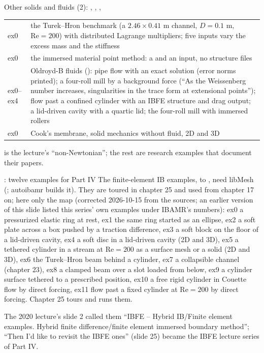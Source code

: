 \documentclass[aspectratio=169,11pt]{beamer}
\begin{document}
\begin{frame}{Other solids and fluids (2): , , , }
\label{fr:others2}
\scriptsize
\setlength{\tabcolsep}{3pt}
\begin{tabular}{@{}L{0.18\textwidth}L{0.78\textwidth}@{}}
\toprule
{} ex0 & the Turek--Hron benchmark (a $2.46\times0.41$ m channel, $D = 0.1$ m, $\mathrm{Re} = 200$) with distributed Lagrange multipliers; five inputs vary the excess mass and the stiffness\\
 ex0 & the immersed material point method: a  and an input, no structure files\\
 ex0--ex4 & Oldroyd-B fluids (): pipe flow with an exact solution (error norms printed); a four-roll mill by a background force (``As the Weissenberg number increases, singularities in the trace form at extensional points''); flow past a confined cylinder with an IBFE structure and drag output; a lid-driven cavity with a quartic lid; the four-roll mill with immersed rollers\\
 ex0 & Cook's membrane, solid mechanics without fluid, 2D and 3D\\
\bottomrule
\end{tabular}
\vspace{1mm}

\scriptsize {} is the lecture's ``non-Newtonian''; the rest are research examples that document their papers.
\end{frame}

\begin{frame}{: twelve examples for Part IV}
\label{fr:ibfe}
\footnotesize The finite-element IB examples,  to , need libMesh (; autoibamr builds it). They are toured in chapter 25 and used from chapter 17 on; here only the map (corrected 2026-10-15 from the sources; an earlier version of this slide listed this series' own examples under IBAMR's numbers): ex0 a pressurized elastic ring at rest, ex1 the same ring started as an ellipse, ex2 a soft plate across a box pushed by a traction difference, ex3 a soft block on the floor of a lid-driven cavity, ex4 a soft disc in a lid-driven cavity (2D and 3D), ex5 a tethered cylinder in a stream at $\mathrm{Re} = 200$ as a surface mesh or a solid (2D and 3D), ex6 the Turek--Hron beam behind a cylinder, ex7 a collapsible channel (chapter 23), ex8 a clamped beam over a slot loaded from below, ex9 a cylinder surface tethered to a prescribed position, ex10 a free rigid cylinder in Couette flow by direct forcing, ex11 flow past a fixed cylinder at $\mathrm{Re} = 200$ by direct forcing. Chapter 25 tours and runs them.
\begin{punchbox}
\footnotesize The 2020 lecture's slide 2 called them ``IBFE -- Hybrid IB/Finite element examples. Hybrid finite difference/finite element immersed boundary method''; ``Then I'd like to revisit the IBFE ones'' (slide 25) became the IBFE lecture series of Part IV.
\end{punchbox}
\end{frame}
\end{document}
